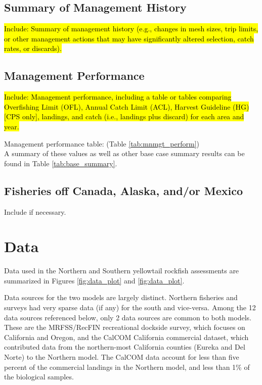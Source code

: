 \documentclass[12pt,]{article}
\begin{document}
\subsection{Summary of Management
History}\label{summary-of-management-history}

\hl{Include: Summary of management history (e.g., changes in mesh sizes, trip 
limits, or other management actions that may have significantly altered selection, 
catch rates, or discards).}

\subsection{Management Performance}\label{management-performance-1}

\hl{Include: Management performance, including a table or tables comparing 
Overfishing Limit (OFL), Annual Catch Limit (ACL), Harvest Guideline (HG) 
[CPS only], landings, and catch (i.e., landings plus discard) for each area and year.}

Management performance table: (Table \ref{tab:mnmgt_perform})\\
A summary of these values as well as other base case summary results can
be found in Table \ref{tab:base_summary}.

\subsection{Fisheries off Canada, Alaska, and/or
Mexico}\label{fisheries-off-canada-alaska-andor-mexico}

Include if necessary.

\section{Data}\label{data}

Data used in the Northern and Southern yellowtail rockfish assessments
are summarized in Figures \ref{fig:data_plot} and \ref{fig:data_plot}.

Data sources for the two models are largely distinct. Northern fisheries
and surveys had very sparse data (if any) for the south and vice-versa.
Among the 12 data sources referenced below, only 2 data sources are
common to both models. These are the MRFSS/RecFIN recreational dockside
survey, which focuses on California and Oregon, and the CalCOM
California commercial dataset, which contributed data from the
northern-most California counties (Eureka and Del Norte) to the Northern
model. The CalCOM data account for less than five percent of the
commercial landings in the Northern model, and less than 1\% of the
biological samples.
\end{document}
